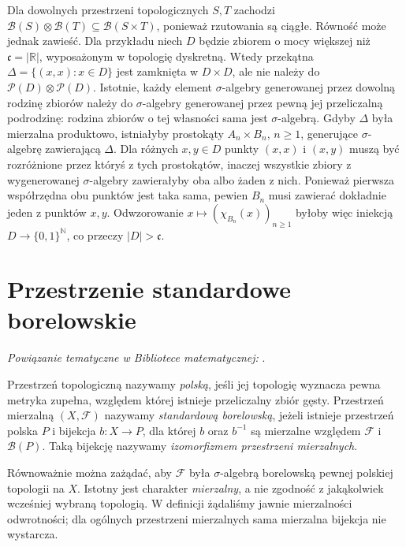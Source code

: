 \begin{uwaga}
Dla dowolnych przestrzeni topologicznych $S,T$ zachodzi
$\mathcal B(S)\otimes\mathcal B(T)\subseteq\mathcal B(S\times T)$,
ponieważ rzutowania są ciągłe. Równość może jednak zawieść.
Dla przykładu niech $D$ będzie zbiorem o mocy większej niż
$\mathfrak c=|\mathbb R|$, wyposażonym w topologię dyskretną.
Wtedy przekątna $\Delta=\{(x,x):x\in D\}$ jest zamknięta
w $D\times D$, ale nie należy do
$\mathcal P(D)\otimes\mathcal P(D)$.
Istotnie, każdy element $\sigma$-algebry generowanej
przez dowolną rodzinę zbiorów należy do $\sigma$-algebry
generowanej przez pewną jej przeliczalną podrodzinę:
rodzina zbiorów o tej własności sama jest $\sigma$-algebrą.
Gdyby $\Delta$ była mierzalna produktowo, istniałyby
prostokąty $A_n\times B_n$, $n\ge1$, generujące
$\sigma$-algebrę zawierającą $\Delta$.
Dla różnych $x,y\in D$ punkty $(x,x)$ i $(x,y)$
muszą być rozróżnione przez któryś z tych prostokątów,
inaczej wszystkie zbiory z wygenerowanej $\sigma$-algebry
zawierałyby oba albo żaden z nich. Ponieważ pierwsza
współrzędna obu punktów jest taka sama, pewien $B_n$
musi zawierać dokładnie jeden z punktów $x,y$.
Odwzorowanie $x\mapsto(\chi_{B_n}(x))_{n\ge1}$
byłoby więc iniekcją $D\to\{0,1\}^{\mathbb N}$, co
przeczy $|D|>\mathfrak c$.
\end{uwaga}

\section{Przestrzenie standardowe borelowskie}

\noindent\emph{Powiązanie tematyczne w Bibliotece matematycznej:} .


\begin{definicja}
\label{def:standard-borel}
Przestrzeń topologiczną nazywamy \emph{polską}, jeśli
jej topologię wyznacza pewna metryka zupełna, względem
której istnieje przeliczalny zbiór gęsty. Przestrzeń mierzalną $(X,\mathcal F)$ nazywamy
\emph{standardową borelowską}, jeżeli istnieje przestrzeń
polska $P$ i bijekcja $b:X\to P$, dla której
$b$ oraz $b^{-1}$ są mierzalne względem
$\mathcal F$ i $\mathcal B(P)$. Taką bijekcję
nazywamy \emph{izomorfizmem przestrzeni mierzalnych}.
\end{definicja}

\begin{uwaga}
Równoważnie można zażądać, aby $\mathcal F$ była
$\sigma$-algebrą borelowską pewnej polskiej topologii na $X$.
Istotny jest charakter \emph{mierzalny}, a nie zgodność
z jakąkolwiek wcześniej wybraną topologią. W definicji
żądaliśmy jawnie mierzalności odwrotności; dla ogólnych
przestrzeni mierzalnych sama mierzalna bijekcja nie wystarcza.
\end{uwaga}

